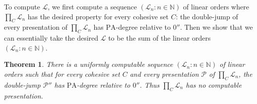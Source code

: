 \documentclass[11pt,a4paper,reqno]{amsart}
\newtheorem{Theorem}{Theorem}[section]
\theoremstyle{definition}
\newcommand{\pa}{\mathrm{PA}}
\newcommand{\Nb}{\mathbb{N}}
\newcommand{\mc}[1]{\mathcal{#1}}
\begin{document}
To compute $\mc{L}$, we first compute a sequence $(\mc{L}_n : n \in \Nb)$ of linear orders where $\prod_C \mc{L}_n$ has the desired property for every cohesive set $C$:  the double-jump of every presentation of $\prod_C \mc{L}_n$ has $\pa$-degree relative to $0''$.  Then we show that we can essentially take the desired $\mc{L}$ to be the sum of the linear orders $(\mc{L}_n : n \in \Nb)$.

\begin{Theorem}\label{thm-ProdNonRec}
There is a uniformly computable sequence $(\mc{L}_n : n \in \Nb)$ of linear orders such that for every cohesive set $C$ and every presentation $\mc{P}$ of $\prod_C \mc{L}_n$, the double-jump $\mc{P}''$ has $\pa$-degree relative to $0''$.  Thus $\prod_C \mc{L}_n$ has no computable presentation.
\end{Theorem}
\end{document}
